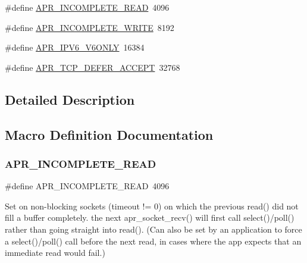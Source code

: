 \begin{DoxyCompactItemize}
\#define \mbox{\hyperlink{group__apr__sockopt_ga73b6c80791c5148c2a416e03a8a1ff8a}{A\+P\+R\+\_\+\+I\+N\+C\+O\+M\+P\+L\+E\+T\+E\+\_\+\+R\+E\+AD}}~4096
\item 
\#define \mbox{\hyperlink{group__apr__sockopt_ga0c1544983845bf747b4a2a3facfb45e9}{A\+P\+R\+\_\+\+I\+N\+C\+O\+M\+P\+L\+E\+T\+E\+\_\+\+W\+R\+I\+TE}}~8192
\item 
\#define \mbox{\hyperlink{group__apr__sockopt_gae1126f69a19a23c484e3292b016375df}{A\+P\+R\+\_\+\+I\+P\+V6\+\_\+\+V6\+O\+N\+LY}}~16384
\item 
\#define \mbox{\hyperlink{group__apr__sockopt_gaa81adac9b40a87f1d4c0c2f037e9af78}{A\+P\+R\+\_\+\+T\+C\+P\+\_\+\+D\+E\+F\+E\+R\+\_\+\+A\+C\+C\+E\+PT}}~32768
\end{DoxyCompactItemize}


\subsection{Detailed Description}


\subsection{Macro Definition Documentation}
\mbox{\label{group__apr__sockopt_ga73b6c80791c5148c2a416e03a8a1ff8a}} 
\subsubsection{\texorpdfstring{A\+P\+R\+\_\+\+I\+N\+C\+O\+M\+P\+L\+E\+T\+E\+\_\+\+R\+E\+AD}{APR\_INCOMPLETE\_READ}}
{\footnotesize\ttfamily \#define A\+P\+R\+\_\+\+I\+N\+C\+O\+M\+P\+L\+E\+T\+E\+\_\+\+R\+E\+AD~4096}

Set on non-\/blocking sockets (timeout != 0) on which the previous read() did not fill a buffer completely. the next apr\+\_\+socket\+\_\+recv() will first call select()/poll() rather than going straight into read(). (Can also be set by an application to force a select()/poll() call before the next read, in cases where the app expects that an immediate read would fail.) \mbox{\label{group__apr__sockopt_ga0c1544983845bf747b4a2a3facfb45e9}} 

